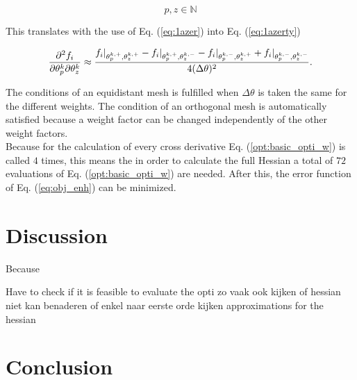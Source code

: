 \[p,z \in \mathbb{N}\]

This translates with the use of Eq. (\ref{eq:1azer}) into Eq. (\ref{eq:1azerty}) 

\begin{equation}\label{eq:1azerty}
\pdv{f_i}{\theta^{k}_p}{\theta^{k}_z} \approx \frac{f_i|_{\theta^{k,+}_p,\theta^{k,+}_z} - f_i|_{\theta^{k,+}_p,\theta^{k,-}_z} - f_i|_{\theta^{k,-}_p,\theta^{k,+}_z}+f_i|_{\theta^{k,-}_p,\theta^{k,-}_z}}{4(\Delta \theta)^2}.
\end{equation}

The conditions of an equidistant mesh is fulfilled when $\Delta \theta$ is taken the same for the different weights. The condition of an orthogonal mesh is automatically satisfied because a weight factor can be changed independently of the other weight factors. \\
Because for the calculation of every cross derivative Eq. (\ref{opt:basic_opti_w}) is called $4$ times, this means the in order to calculate the full Hessian a total of $72$ evaluations of Eq. (\ref{opt:basic_opti_w}) are needed. After this, the error function of Eq. (\ref{eq:obj_enh}) can be minimized. 





\section{Discussion} \label{s:discussion_enh}
Because 


Have to check if it is feasible to evaluate the opti zo vaak
ook kijken of hessian niet kan benaderen
of enkel naar eerste orde kijken
approximations for the hessian
\section{Conclusion}\label{s:conclusion_enh}

